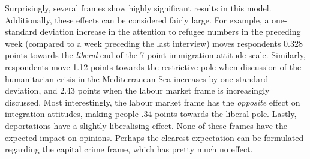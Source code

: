 \documentclass{article}
\begin{document}
Surprisingly, several frames show highly significant results in this model. Additionally, these effects can be considered fairly large. For example, a one-standard deviation increase in the attention to refugee numbers in the preceding week (compared to a week preceding the last interview) moves respondents 0.328 points towards the \textit{liberal} end of the 7-point immigration attitude scale. Similarly, respondents move 1.12 points towards the restrictive pole when discussion of the humanitarian crisis in the Mediterranean Sea increases by one standard deviation, and 2.43 points when the labour market frame is increasingly discussed.  Most interestingly, the labour market frame has the \textit{opposite} effect on integration attitudes, making people .34 points towards the liberal pole. Lastly, deportations have a slightly liberalising effect. None of these frames have the expected impact on opinions. Perhaps the clearest expectation can be formulated regarding the capital crime frame, which has pretty much no effect.
\end{document}

